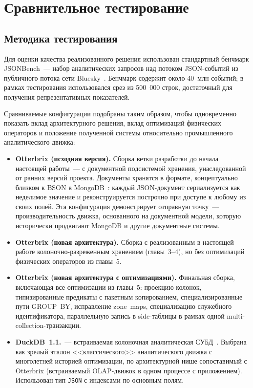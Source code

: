 \chapter{Сравнительное тестирование}\label{ch:results}

\section{Методика тестирования}

Для оценки качества реализованного решения использован стандартный
бенчмарк JSONBench~--- набор аналитических запросов над потоком
JSON-событий из публичного потока сети
Bluesky~\cite{jsonbench}. Бенчмарк содержит около 40~млн событий; в
рамках тестирования использовался срез из 500~000 строк, достаточный
для получения репрезентативных показателей.

Сравниваемые конфигурации подобраны таким образом, чтобы
одновременно показать вклад архитектурного решения, вклад
оптимизаций физических операторов и положение полученной системы
относительно промышленного аналитического движка:

\begin{itemize}
    \item \textbf{Otterbrix (исходная версия).} Сборка ветки
    разработки до начала настоящей работы~--- с документной
    подсистемой хранения, унаследованной от ранних версий проекта.
    Документы хранятся в формате, концептуально близком к BSON в
    MongoDB~\cite{mongodb-bson}: каждый JSON-документ сериализуется
    как неделимое значение и реконструируется построчно при доступе
    к любому из своих полей. Эта конфигурация демонстрирует
    отправную точку~--- производительность движка, основанного на
    документной модели, которую исторически продвигают MongoDB и
    другие документные системы.
    \item \textbf{Otterbrix (новая архитектура).} Сборка с
    реализованным в настоящей работе колоночно-разреженным
    хранением (главы~3--4), но без оптимизаций физических
    операторов из главы~5.
    \item \textbf{Otterbrix (новая архитектура с оптимизациями).}
    Финальная сборка, включающая все оптимизации из главы~5:
    проекцию колонок, типизированные предикаты с пакетным
    копированием, специализированные пути GROUP~BY, исправление
    zone~maps, специализацию служебного идентификатора,
    параллельную запись в side-таблицы в рамках одной
    multi-collection-транзакции.
    \item \textbf{DuckDB~1.1.}~--- встраиваемая колоночная
    аналитическая СУБД~\cite{raasveldt2019}. Выбрана как зрелый
    эталон <<классического>> аналитического движка с многолетней
    историей оптимизации, по архитектурной нише сопоставимый с
    Otterbrix (встраиваемый OLAP-движок в одном процессе с
    приложением). Использован тип \texttt{JSON} с индексами по
    основным полям.
\end{itemize}

